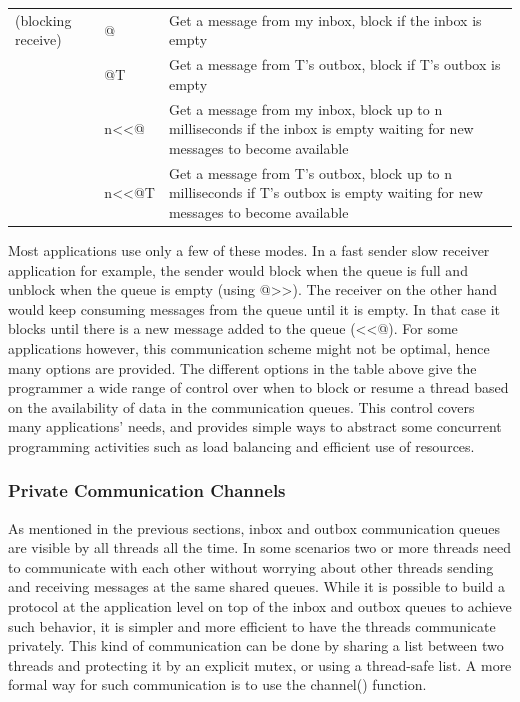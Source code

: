 \begin{flushleft}
\begin{supertabular}{m{0.8920598in}m{0.8643598in}m{4.10186in}}
\centering (blocking receive) &
\centering {\textless}{\textless}@ &
Get a message from my inbox, block if the inbox is empty\\
 &
\centering {\textless}{\textless}@T &
Get a message from T{\textquoteright}s outbox, block if
T{\textquoteright}s outbox is empty\\
 &
\centering n{\textless}{\textless}@ &
Get a message from my inbox, block up to n milliseconds if the inbox is
empty waiting for new messages to become available\\
 &
\centering n{\textless}{\textless}@T &
Get a message from T{\textquoteright}s outbox, block up to n
milliseconds if T{\textquoteright}s outbox is empty waiting for new
messages to become available\\
\end{supertabular}
\end{flushleft}

\bigskip

Most applications use only a few of these modes. In a fast sender slow receiver
application for example, the sender would block when the queue is full
and unblock when the queue is empty (using
\textsf{@{\textgreater}{\textgreater}}). The receiver
on the other hand would keep consuming messages from the queue until it
is empty. In that case it blocks until there is a new message added to
the queue (\textsf{{\textless}{\textless}@}). For some
applications however, this communication scheme might not be optimal,
hence many options are provided. The different options in the table
above give the programmer a wide range of control over when to block or
resume a thread based on the availability of data in the communication
queues. This control covers many applications{\textquoteright} needs,
and provides simple ways to abstract some concurrent programming
activities such as load balancing and efficient use of resources.

\subsubsection{Private Communication Channels }

As mentioned in the previous sections, inbox and outbox communication
queues are visible by all threads all the time. In some scenarios two
or more threads need to communicate with each other without worrying
about other threads sending and receiving messages at the same shared
queues. While it is possible to build a protocol at the application
level on top of the inbox and outbox queues to achieve such behavior,
it is simpler and more efficient to have the threads communicate
privately. This kind of communication can be done by sharing a list
between two threads and protecting it by an explicit mutex, or using a
thread-safe list. A more formal way for such communication is to use
the \textsf{channel()} function. 

